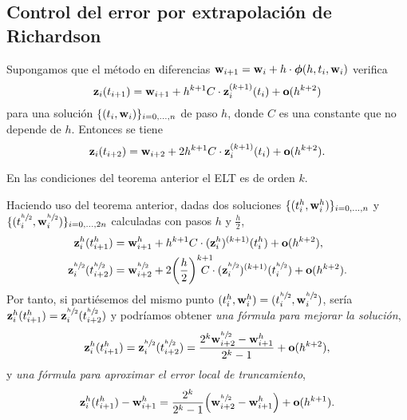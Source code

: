 \subsection{Control del error por extrapolación de Richardson}

\begin{theorem}
    \newcommand{\hh}{\sfrac{h}{2}}

    Supongamos que el método en diferencias 
    $\vb{w}_{i+1} = \vb{w}_i + h\cdot \vb*{\phi}(h, t_i, \vb{w}_i)$
    verifica
    \begin{equation*}\label{eq7}
        \vb{z}_i(t_{i+1}) =
        \vb{w}_{i+1} + h^{k+1}C\cdot \vb{z}_i^{(k+1)}(t_i) + \vb{o}(h^{k+2})
    \end{equation*}
    para una solución $\{(t_i, \vb{w}_i)\}_{i = 0,\ldots,n}$ de paso $h$,
    donde $C$ es una constante que no depende de $h$.
    Entonces se tiene
    \begin{equation*}\label{eq8}
        \vb{z}_i(t_{i+2}) =
        \vb{w}_{i+2} + 2h^{k+1}C\cdot \vb{z}_i^{(k+1)}(t_i) + \vb{o}(h^{k+2}).
    \end{equation*}
\end{theorem}

\begin{remark}
    En las condiciones del teorema anterior el ELT es de orden $k$.
\end{remark}

\newcommand{\hh}{\sfrac{h}{2}}

Haciendo uso del teorema anterior, dadas dos soluciones
$\{(t^h_i, \vb{w}^h_i)\}_{i = 0,\ldots,n}$ y
$\{(t^{\hh}_i, \vw^{\hh}_i)\}_{i = 0,\ldots,2n}$
calculadas con pasos $h$ y $\frac{h}{2}$,
\begin{align*}\label{eq8}
    \vz^{h}_i(t^{h}_{i+1}) &=
    \vw^{h}_{i+1} + h^{k+1}C\cdot (\vz^{h}_i)^{(k+1)}(t^{h}_i)
        + \vo(h^{k+2}), \\
    \vz^{\hh}_i(t^{\hh}_{i+2}) &=
    \vw^{\hh}_{i+2} + 2\qty(\frac{h}{2})^{k+1} \hspace{-4mm} C\cdot
        (\vz^{\hh}_i)^{(k+1)}(t^{\hh}_i) + \vo(h^{k+2}).
\end{align*}
Por tanto, si partiésemos del mismo punto
$(t^h_i, \vw^h_i) = (t^{\hh}_i, \vw^{\hh}_i)$,
sería $\vz^h_i(t^h_{i+1}) = \vz^{\hh}_i(t^{\hh}_{i+2})$
y podríamos obtener \emph{una fórmula para mejorar la solución},
\begin{equation*}
    \vz^h_i(t^h_{i+1}) = \vz^{\hh}_i(t^{\hh}_{i+2}) =
    \frac{2^k\vw^{\hh}_{i+2} - \vw^h_{i+1}}{2^k - 1} + \vo(h^{k+2}),
\end{equation*}
y \emph{una fórmula para aproximar el error local de truncamiento},
\begin{equation*}
    \vz^h_i(t^h_{i+1}) - \vw^h_{i+1} =
    \frac{2^k}{2^k-1}\qty(\vw^{\hh}_{i+2} - \vw^h_{i+1}) + \vo(h^{k+1}).
\end{equation*}

